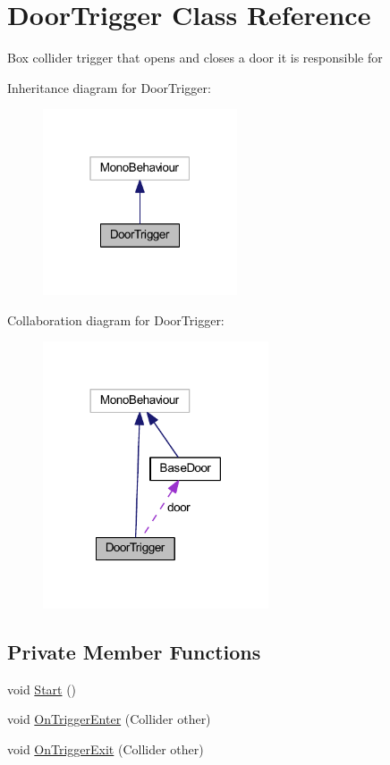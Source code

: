 \hypertarget{class_door_trigger}{}\section{Door\+Trigger Class Reference}
\label{class_door_trigger}


Box collider trigger that opens and closes a door it is responsible for  




Inheritance diagram for Door\+Trigger\+:
\nopagebreak
\begin{figure}[H]
\begin{center}
\leavevmode
\includegraphics[width=163pt]{class_door_trigger__inherit__graph}
\end{center}
\end{figure}


Collaboration diagram for Door\+Trigger\+:
\nopagebreak
\begin{figure}[H]
\begin{center}
\leavevmode
\includegraphics[width=189pt]{class_door_trigger__coll__graph}
\end{center}
\end{figure}
\subsection*{Private Member Functions}
\begin{DoxyCompactItemize}
\item 
void \mbox{\hyperlink{class_door_trigger_a3b079888a26feb3139b6a0507b89c65c}{Start}} ()
\item 
void \mbox{\hyperlink{class_door_trigger_a9cad842a8527ec462aae682c8c50b118}{On\+Trigger\+Enter}} (Collider other)
\item 
void \mbox{\hyperlink{class_door_trigger_adee54426b691466c5d667b912816bb56}{On\+Trigger\+Exit}} (Collider other)
\end{DoxyCompactItemize}
